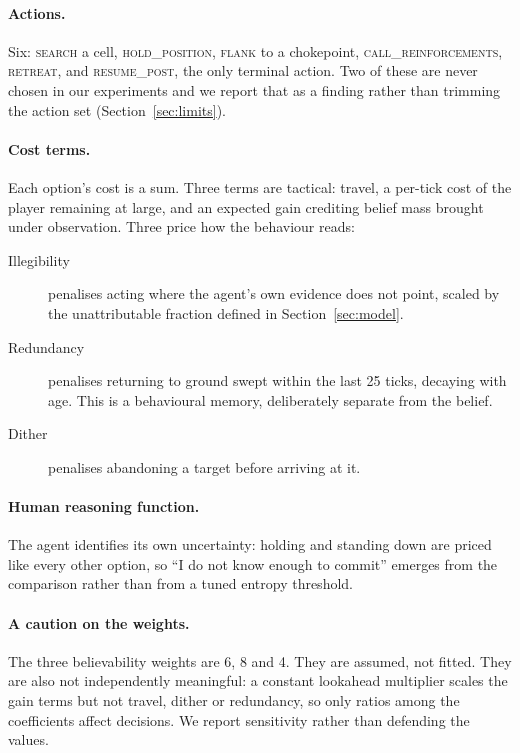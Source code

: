 \documentclass{article}
\begin{document}
\paragraph{Actions.}
Six: \textsc{search} a cell, \textsc{hold\_position}, \textsc{flank} to a chokepoint,
\textsc{call\_reinforcements}, \textsc{retreat}, and \textsc{resume\_post}, the only terminal
action. Two of these are never chosen in our experiments and we report that as a finding rather
than trimming the action set (Section~\ref{sec:limits}).

\paragraph{Cost terms.}
Each option's cost is a sum. Three terms are tactical: travel, a per-tick cost of the player
remaining at large, and an expected gain crediting belief mass brought under observation. Three
price how the behaviour reads:

\begin{description}
\item[Illegibility] penalises acting where the agent's own evidence does not point, scaled by
the unattributable fraction defined in Section~\ref{sec:model}.
\item[Redundancy] penalises returning to ground swept within the last 25 ticks, decaying with
age. This is a behavioural memory, deliberately separate from the belief.
\item[Dither] penalises abandoning a target before arriving at it.
\end{description}

\paragraph{Human reasoning function.}
The agent identifies its own uncertainty: holding and standing down are priced like every other
option, so ``I do not know enough to commit'' emerges from the comparison rather than from a
tuned entropy threshold.

\paragraph{A caution on the weights.}
The three believability weights are 6, 8 and 4. They are assumed, not fitted. They are also not
independently meaningful: a constant lookahead multiplier scales the gain terms but not travel,
dither or redundancy, so only ratios among the coefficients affect decisions. We report
sensitivity rather than defending the values.
\end{document}
